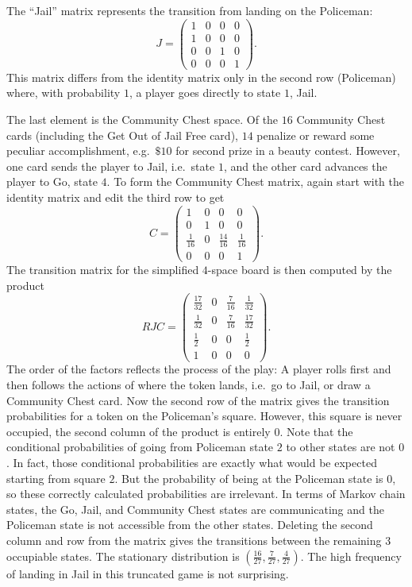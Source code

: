\documentclass[12pt]{article}
\begin{document}
The ``Jail'' matrix represents the transition from landing on the
Policeman:
\[
    J =
    \begin{pmatrix}
        1 & 0 & 0 & 0 \\
        1 & 0 & 0 & 0 \\
        0 & 0 & 1 & 0 \\
        0 & 0 & 0 & 1
    \end{pmatrix}
    .
\] This matrix differs from the identity matrix only in the second row (Policeman)
where, with probability \( 1 \), a player goes directly to state \( 1 \),
Jail.

The last element is the Community Chest space.  Of the \( 16 \)
Community Chest cards (including the Get Out of Jail Free card), \( 14 \)
penalize or reward some peculiar accomplishment, e.g.\ \( \$10 \) for
second prize in a beauty contest.  However, one card sends the player to
Jail, i.e.\ state \( 1 \), and the other card advances the player to Go,
state \( 4 \).  To form the Community Chest matrix, again start with the
identity matrix and edit the third row to get
\[
    C =
    \begin{pmatrix}
        1 & 0 & 0 & 0 \\
        0 & 1 & 0 & 0 \\
        \frac{1}{16} & 0 & \frac{14}{16} & \frac{1}{16} \\
        0 & 0 & 0 & 1
    \end{pmatrix}
    .
\] The transition matrix for the simplified \( 4 \)-space board is then
computed by the product
\[
    RJC =
    \begin{pmatrix}
        \frac{17}{32} & 0 & \frac{7}{16} & \frac{1}{32} \\
        \frac{1}{32} & 0 & \frac{7}{16} & \frac{17}{32} \\
        \frac{1}{2} & 0 & 0 & \frac{1}{2} \\
        1 & 0 & 0 & 0
    \end{pmatrix}
    .
\] The order of the factors reflects the process of the play:  A player
rolls first and then follows the actions of where the token lands, i.e.\
go to Jail, or draw a Community Chest card. Now the second row of the
matrix gives the transition probabilities for a token on the Policeman's
square.  However, this square is never occupied, the second column of
the product is entirely \( 0 \). Note that the conditional probabilities
of going from Policeman state \( 2 \) to other states are not \( 0 \).
In fact, those conditional probabilities are exactly what would be
expected starting from square \( 2 \). But the probability of being at
the Policeman state is \( 0 \), so these correctly calculated
probabilities are irrelevant. In terms of Markov chain states, the Go,
Jail, and Community Chest states are communicating and the Policeman
state is not accessible from the other states. Deleting the second
column and row from the matrix gives the transitions between the
remaining \( 3 \) occupiable states.  The stationary distribution is \(
(\frac{16}{27}, \frac{7}{27}, \frac{4}{27}) \).  The high frequency of
landing in Jail in this truncated game is not surprising.
\end{document}
